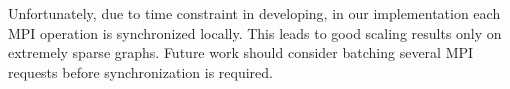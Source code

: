 Unfortunately, due to time constraint in developing, in our implementation each MPI operation is synchronized locally.
This leads to good scaling results only on extremely sparse graphs. %
Future work should consider batching several MPI requests before synchronization is required.
